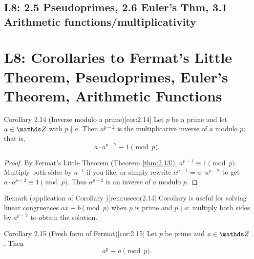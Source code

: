 \documentclass[10pt]{article}
\theoremstyle{definition}
\theoremstyle{plain}
\numberwithin{equation}{section}
\begin{document}
\newpage
\subsection{L8: 2.5 Pseudoprimes, 2.6 Euler's Thm, 3.1 Arithmetic functions/multiplicativity}


\section*{L8: Corollaries to Fermat's Little Theorem, Pseudoprimes, Euler's Theorem, Arithmetic Functions}


\begin{define}{Corollary 2.14 (Inverse modulo a prime)}[cor:2.14]
Let $p$ be a prime and let $a\in\setZ$ with $p\nmid a$. Then $a^{p-2}$ is the multiplicative
inverse of $a$ modulo $p$; that is,
\[
a\cdot a^{p-2}\equiv 1\pmod{p}.
\]
\end{define}

\begin{proof}
By Fermat's Little Theorem (Theorem \ref{thm:2.13}), $a^{p-1}\equiv 1\pmod{p}$. Multiply both sides
by $a^{-1}$ if you like, or simply rewrite $a^{p-1}=a\cdot a^{p-2}$ to get $a\cdot a^{p-2}\equiv 1\pmod{p}$.
Thus $a^{p-2}$ is an inverse of $a$ modulo $p$.
\end{proof}

\begin{define}{Remark (application of Corollary )}[rem:usecor2.14]
Corollary  is useful for solving linear congruences $ax\equiv b\pmod p$
when $p$ is prime and $p\nmid a$: multiply both sides by $a^{p-2}$ to obtain the solution.
\end{define}

\begin{define}{Corollary 2.15 (Fresh form of Fermat)}[cor:2.15]
Let $p$ be prime and $a\in\setZ$. Then
\[
a^p\equiv a\pmod{p}.
\]
\end{define}
\end{document}
